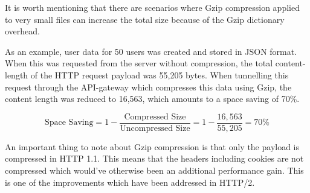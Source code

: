 \documentclass{cslthse-msc}
\begin{document}
It is worth mentioning that there are scenarios where Gzip compression applied to very small files can increase the total size because of the Gzip dictionary overhead\cite{google_gzip}.


As an example, user data for 50 users was created and stored in JSON format. When this was requested from the server without compression, the total content-length of the HTTP request payload was 55,205 bytes. When tunnelling this request through the API-gateway which compresses this data using Gzip, the content length was reduced to 16,563, which amounts to a space saving of 70\%. 

\begin{equation}
\mbox{Space Saving} = 1 - \frac{\mbox{Compressed Size}}{\mbox{Uncompressed Size}} = 1 - \frac{16,563}{55,205} = 70\%
\end{equation}

An important thing to note about Gzip compression is that only the payload is compressed in HTTP 1.1\cite{header_compression}. This means that the headers including cookies are not compressed which would've otherwise been an additional performance gain. This is one of the improvements which have been addressed in HTTP/2\cite[p. 222]{HPBN}.

\end{document}
